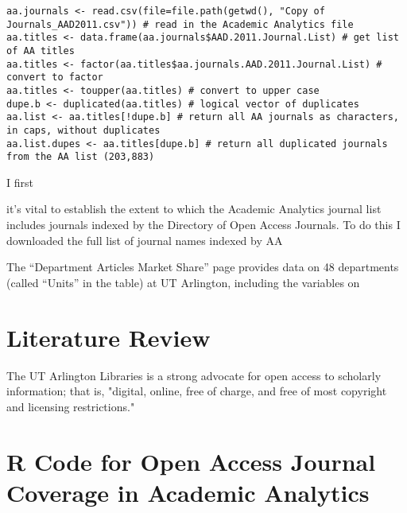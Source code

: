 \documentclass{article}
\begin{document}
\begin{lstlisting}
aa.journals <- read.csv(file=file.path(getwd(), "Copy of Journals_AAD2011.csv")) # read in the Academic Analytics file
aa.titles <- data.frame(aa.journals$AAD.2011.Journal.List) # get list of AA titles
aa.titles <- factor(aa.titles$aa.journals.AAD.2011.Journal.List) # convert to factor
aa.titles <- toupper(aa.titles) # convert to upper case
dupe.b <- duplicated(aa.titles) # logical vector of duplicates
aa.list <- aa.titles[!dupe.b] # return all AA journals as characters, in caps, without duplicates
aa.list.dupes <- aa.titles[dupe.b] # return all duplicated journals from the AA list (203,883)
\end{lstlisting}

I first 



it's vital to establish the extent to which the Academic Analytics journal list includes journals indexed by the Directory of Open Access Journals. To do this I downloaded the full list of journal names indexed by AA





The “Department Articles Market Share” page provides data on 48 departments (called “Units” in the table) at UT Arlington, including the variables on 





\section{Literature Review}
The UT Arlington Libraries is a strong advocate for open access to scholarly information; that is, "digital, online, free of charge, and free of most copyright and licensing restrictions."  \cite{RefWorks:102}













\appendix
\section{R Code for Open Access Journal Coverage in Academic Analytics}
\end{document}
